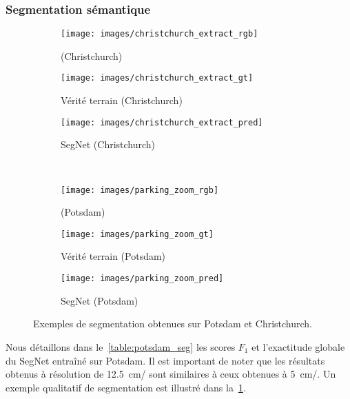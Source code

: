 \subsubsection{Segmentation sémantique}
\begin{figure}[t]
	\centering
	\begin{subfigure}{0.3\textwidth}
    	\texttt{[image: images/christchurch\_extract\_rgb]}
      \caption*{ (Christchurch)}
    \end{subfigure}
    \begin{subfigure}{0.3\textwidth}
    	\texttt{[image: images/christchurch\_extract\_gt]}
      \caption*{Vérité terrain (Christchurch)}
    \end{subfigure}
    \begin{subfigure}{0.3\textwidth}
    	\texttt{[image: images/christchurch\_extract\_pred]}
      \caption*{SegNet (Christchurch)}
    \end{subfigure}\\
    	\begin{subfigure}{0.3\textwidth}
    	\texttt{[image: images/parking\_zoom\_rgb]}
        \caption*{ (Potsdam)}
    \end{subfigure}
    \begin{subfigure}{0.3\textwidth}
    	\texttt{[image: images/parking\_zoom\_gt]}
        \caption*{Vérité terrain (Potsdam)}
    \end{subfigure}
    \begin{subfigure}{0.3\textwidth}
    	\texttt{[image: images/parking\_zoom\_pred]}
        \caption*{SegNet (Potsdam)}
    \end{subfigure}

    \caption{Exemples de segmentation obtenues sur Potsdam et Christchurch.\\\isprslegende}
    \label{fig:segmentations}
\end{figure}

Nous détaillons dans le~\cref{table:potsdam_seg} les scores $F_1$ et l'exactitude globale du SegNet entraîné sur Potsdam. Il est important de noter que les résultats obtenus à résolution de \SI{12,5}{\centi\meter/\px} sont similaires à ceux obtenues à \SI{5}{\centi\meter/\px}. Un exemple qualitatif de segmentation est illustré dans la~\cref{fig:segmentations}.

